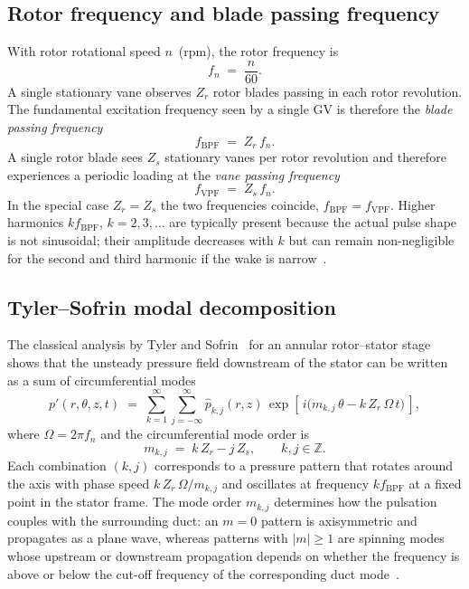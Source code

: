 \subsection{Rotor frequency and blade passing frequency}
\label{sec:rsi-bpf}
 
With rotor rotational speed $n$~(rpm), the rotor frequency
is
\begin{equation}
    f_n \;=\; \frac{n}{60}. \label{eq:fn}
\end{equation}
A single stationary vane observes $Z_r$ rotor blades passing in each
rotor revolution. The fundamental excitation frequency seen by a
single GV is therefore the \emph{blade passing
frequency}~\cite{Brekke2015}
\begin{equation}
    f_{\mathrm{BPF}} \;=\; Z_r\, f_n. \label{eq:fbpf}
\end{equation}
A single rotor blade sees $Z_s$ stationary vanes per rotor revolution
and therefore experiences a periodic loading at the \emph{vane
passing frequency}
\begin{equation}
    f_{\mathrm{VPF}} \;=\; Z_s\, f_n. \label{eq:fvpf}
\end{equation}
In the special case $Z_r = Z_s$ the two frequencies coincide,
$f_{\mathrm{BPF}} = f_{\mathrm{VPF}}$. Higher harmonics
$k f_{\mathrm{BPF}}$, $k=2,3,\dots$ are typically present because
the actual pulse shape is not sinusoidal; their amplitude decreases
with $k$ but can remain non-negligible for the second and third
harmonic if the wake is
narrow~\cite{Egusquiza2006,Rodriguez2007}.
 
\subsection{Tyler--Sofrin modal decomposition}
\label{sec:rsi-tyler}
 
The classical analysis by Tyler and Sofrin~\cite{Tyler1962} for an
annular rotor--stator stage shows that the unsteady pressure field
downstream of the stator can be written as a sum of circumferential
modes
\begin{equation}
    p'(r,\theta,z,t) \;=\; \sum_{k=1}^{\infty}\sum_{j=-\infty}^{\infty}
      \hat{p}_{k,j}(r,z)\,
      \exp\!\left[\, i\bigl(m_{k,j}\,\theta - k\,Z_r\,\Omega\,t\bigr)\,\right],
    \label{eq:tyler_sofrin_expansion}
\end{equation}
where $\Omega = 2\pi f_n$ and the circumferential mode order is
\begin{equation}
    m_{k,j} \;=\; k\,Z_r - j\,Z_s, \qquad k,j \in \mathbb{Z}.
    \label{eq:tyler_sofrin}
\end{equation}
Each combination $(k,j)$ corresponds to a pressure pattern that
rotates around the axis with phase speed $k\,Z_r\,\Omega/m_{k,j}$ and
oscillates at frequency $k f_{\mathrm{BPF}}$ at a fixed point in the
stator frame. The mode order $m_{k,j}$ determines how the pulsation
couples with the surrounding duct: an $m=0$ pattern is axisymmetric
and propagates as a plane wave, whereas patterns with $|m|\geq 1$
are spinning modes whose upstream or downstream propagation depends
on whether the frequency is above or below the cut-off frequency of
the corresponding duct mode~\cite{Morse1968}.
 
